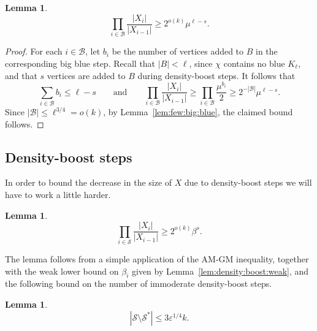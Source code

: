 \documentclass[12pt,reqno]{amsart}
\newtheorem{lemma}[theorem]{Lemma}
\theoremstyle{definition}
\theoremstyle{remark}
\newcommand\cB{\mathcal{B}}
\def\cS{\mathcal{S}}
\newcommand\eps{\varepsilon}
\renewcommand{\le}{\leqslant}
\renewcommand{\ge}{\geqslant}
\def\eps{\varepsilon}
\def\cB{\mathcal{B}}
\begin{document}
\begin{lemma}\label{lem:bigblue:total:decrease}
$$\prod_{i \in \cB} \frac{|X_i|}{|X_{i-1}|} \ge 2^{o(k)} \mu^{\ell-s}.$$
\end{lemma}

\begin{proof}%
For each $i \in \cB$, let $b_i$ be the number of vertices added to $B$ in the corresponding big blue step. Recall that $|B| < \ell$, since $\chi$ contains no blue $K_\ell$, and that $s$ vertices are added to $B$ during density-boost steps. It follows that 
$$\sum_{i \in \cB} b_i \le \ell - s \qquad \text{and} \qquad \prod_{i \in \cB} \frac{|X_i|}{|X_{i-1}|} \ge \prod_{i \in \cB} \frac{\mu^{b_i}}{2} \ge 2^{-|\cB|} \mu^{\ell-s}.$$
Since $|\cB| \le \ell^{3/4} = o(k)$, by Lemma~\ref{lem:few:big:blue}, the claimed bound follows.
\end{proof}


\subsection{Density-boost steps}

In order to bound the decrease in the size of $X$ due to density-boost steps we will have to work a little harder. %

\begin{lemma}\label{lem:densityboost:total:decrease}
$$\prod_{i \in \cS} \frac{|X_i|}{|X_{i-1}|} \ge 2^{o(k)} \beta^s.$$
\end{lemma}

The lemma follows from a simple application of the AM-GM inequality, together with the weak lower bound on $\beta_i$ given by Lemma~\ref{lem:density:boost:weak}, and the following bound on the number of immoderate density-boost steps.  

\begin{lemma}\label{lem:few-big-density-jumps} 
\begin{equation}\label{eq:few-big-density-jumps}
|\cS \setminus \cS^*| \le 3 \eps^{1/4} k.
\end{equation}
\end{lemma}
\end{document}

